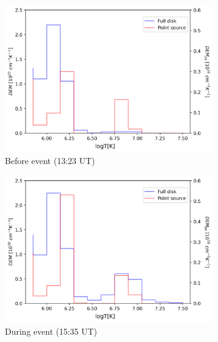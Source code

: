 \begin{figure}[h!]

    \begin{subfigure}[b]{0.3\textwidth}
        \centering
        \includegraphics[width=\textwidth]{images/dem_profile_before_event_2021_oct_28.png}
        \caption{Before event (13:23 UT)}
        \label{fig:dem_pro_oct_28_2021_a}
    \end{subfigure}
    \hfill
    \begin{subfigure}[b]{0.3\textwidth}
        \centering
        \includegraphics[width=\textwidth]{images/dem_profile_during_event_2021_oct_28.png}
        \caption{During event (15:35 UT)}
        \label{fig:dem_pro_oct_28_2021_b}
    \end{subfigure}
    \hfill
    \begin{subfigure}[b]{0.3\textwidth}

\end{subfigure}
\end{figure}

